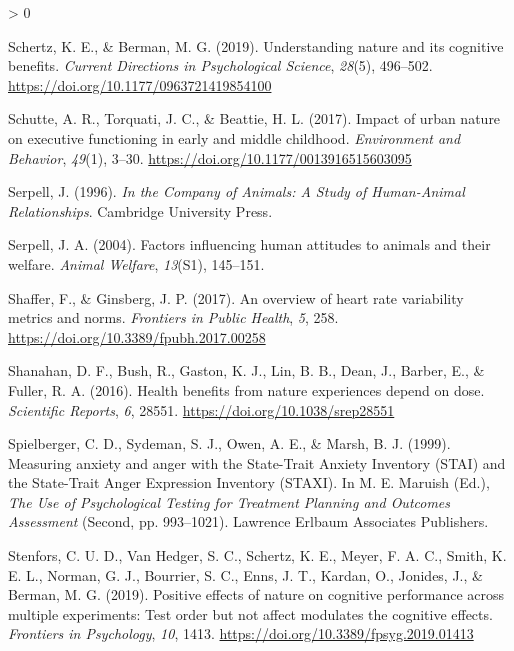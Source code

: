\documentclass[
  english,
  pub,floatsintext]{apa6}
\newlength{\cslhangindent}
\newenvironment{CSLReferences}[2] %
 {%
  \setlength{\parindent}{0pt}
  \ifodd #1 \everypar{\setlength{\hangindent}{\cslhangindent}}\ignorespaces\fi
  \ifnum #2 > 0
  \setlength{\parskip}{#2\baselineskip}
  \fi
 }%
 {}
\begin{document}
\begin{CSLReferences}{1}{0}
\leavevmode\hypertarget{ref-Schertz.Berman.2019}{}%
Schertz, K. E., \& Berman, M. G. (2019). Understanding nature and its cognitive benefits. \emph{Current Directions in Psychological Science}, \emph{28}(5), 496--502. \url{https://doi.org/10.1177/0963721419854100}

\leavevmode\hypertarget{ref-Schutte.etal.2017a}{}%
Schutte, A. R., Torquati, J. C., \& Beattie, H. L. (2017). Impact of urban nature on executive functioning in early and middle childhood. \emph{Environment and Behavior}, \emph{49}(1), 3--30. \url{https://doi.org/10.1177/0013916515603095}

\leavevmode\hypertarget{ref-Serpell.1996}{}%
Serpell, J. (1996). \emph{In the {Company} of {Animals}: {A Study} of {Human}-{Animal Relationships}}. {Cambridge University Press}.

\leavevmode\hypertarget{ref-Serpell.2004}{}%
Serpell, J. A. (2004). Factors influencing human attitudes to animals and their welfare. \emph{Animal Welfare}, \emph{13}(S1), 145--151.

\leavevmode\hypertarget{ref-Shaffer.Ginsberg.2017}{}%
Shaffer, F., \& Ginsberg, J. P. (2017). An overview of heart rate variability metrics and norms. \emph{Frontiers in Public Health}, \emph{5}, 258. \url{https://doi.org/10.3389/fpubh.2017.00258}

\leavevmode\hypertarget{ref-Shanahan.etal.2016}{}%
Shanahan, D. F., Bush, R., Gaston, K. J., Lin, B. B., Dean, J., Barber, E., \& Fuller, R. A. (2016). Health benefits from nature experiences depend on dose. \emph{Scientific Reports}, \emph{6}, 28551. \url{https://doi.org/10.1038/srep28551}

\leavevmode\hypertarget{ref-Spielberger.etal.1999}{}%
Spielberger, C. D., Sydeman, S. J., Owen, A. E., \& Marsh, B. J. (1999). Measuring anxiety and anger with the {State}-{Trait Anxiety Inventory} ({STAI}) and the {State}-{Trait Anger Expression Inventory} ({STAXI}). In M. E. Maruish (Ed.), \emph{The {Use} of {Psychological Testing} for {Treatment Planning} and {Outcomes Assessment}} (Second, pp. 993--1021). {Lawrence Erlbaum Associates Publishers}.

\leavevmode\hypertarget{ref-Stenfors.etal.2019}{}%
Stenfors, C. U. D., Van Hedger, S. C., Schertz, K. E., Meyer, F. A. C., Smith, K. E. L., Norman, G. J., Bourrier, S. C., Enns, J. T., Kardan, O., Jonides, J., \& Berman, M. G. (2019). Positive effects of nature on cognitive performance across multiple experiments: {Test} order but not affect modulates the cognitive effects. \emph{Frontiers in Psychology}, \emph{10}, 1413. \url{https://doi.org/10.3389/fpsyg.2019.01413}


\end{CSLReferences}
\end{document}
